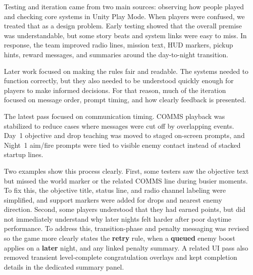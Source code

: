 \documentclass[11pt]{article}
\begin{document}
Testing and iteration came from two main sources: observing how people played and checking core systems in Unity Play Mode. When players were confused, we treated that as a design problem. Early testing showed that the overall premise was understandable, but some story beats and system links were easy to miss. In response, the team improved radio lines, mission text, HUD markers, pickup hints, reward messages, and summaries around the day-to-night transition.

Later work focused on making the rules fair and readable. The systems needed to function correctly, but they also needed to be understood quickly enough for players to make informed decisions. For that reason, much of the iteration focused on message order, prompt timing, and how clearly feedback is presented.

The latest pass focused on communication timing. COMMS playback was stabilized to reduce cases where messages were cut off by overlapping events. Day~1 objective and drop teaching was moved to staged on-screen prompts, and Night~1 aim/fire prompts were tied to visible enemy contact instead of stacked startup lines.

Two examples show this process clearly. First, some testers saw the objective text but missed the world marker or the related COMMS line during busier moments. To fix this, the objective title, status line, and radio channel labeling were simplified, and support markers were added for drops and nearest enemy direction. Second, some players understood that they had earned points, but did not immediately understand why later nights felt harder after poor daytime performance. To address this, transition-phase and penalty messaging was revised so the game more clearly states the \textbf{retry} rule, when a \textbf{queued} enemy boost applies on a \textbf{later} night, and any linked penalty summary. A related UI pass also removed transient level-complete congratulation overlays and kept completion details in the dedicated summary panel.
\end{document}
